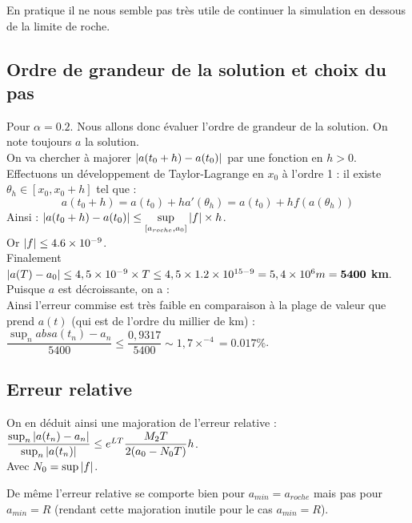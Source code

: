 \documentclass[12pt,a4paper]{article}
\begin{document}
    En pratique il ne nous semble pas très utile de continuer la simulation en dessous de la limite de roche.
	
	\vspace{-.5cm}
	
	\subsection{Ordre de grandeur de la solution et choix du pas}
	
	Pour $\alpha = 0.2$.	
	Nous allons donc évaluer l'ordre de grandeur de la solution. On note toujours $a$ la solution.\\
	On va chercher à majorer $\left\lvert a(t_0+h)-a(t_0) \right\rvert$ par une fonction en $h > 0$.\\
	Effectuons un développement de Taylor-Lagrange en $x_0$ à l'ordre 1 : il existe $\theta_h \in [x_0,x_0+h]$ tel que : 
	\[a(t_0+h) = a(t_0) + ha'(\theta_h) = a(t_0) + hf(a(\theta_h))\]
	Ainsi : $\left\lvert a(t_0+h)-a(t_0) \right\rvert \leq \underset{[a_{roche},a_0]}{\sup} \left\lvert f \right\rvert \times h$.\\
	Or $\left\lvert f \right\rvert \leq 4.6\times 10^{-9}$.\\
	Finalement $\left\lvert a(T)-a_0 \right\rvert \leq 4,5\times10^{-9}\times T \leq 4,5\times1.2\times 10^{15-9} = 5,4\times 10^6 m = \mathbf{5400}$ \textbf{km}.\\
	Puisque $a$ est décroissante, on a : \\
	
	Ainsi l'erreur commise est très faible en comparaison à la plage de valeur que prend $a(t)$ (qui est de l'ordre du millier de km) : $\dfrac{\sup_n abs{a(t_n)-a_n}}{5400} \leq \dfrac{0,9317}{5400} \sim 1,7 \times^{-4} = 0.017 \%$. 
	
	\subsection{Erreur relative}
	
	\vspace{-.5cm}
	
	On en déduit ainsi une majoration de l'erreur relative : $\dfrac{\sup_n\left\lvert a(t_n)-a_n \right\rvert}{\sup_n\left\lvert a(t_n) \right\rvert} \leq e^{LT}\dfrac{M_2 T}{2(a_0-N_0T)}h $.\\
	Avec $N_0 = \sup\left\lvert f \right\rvert$.
	
	\vspace{.2cm}
	
	De même l'erreur relative se comporte bien pour $a_{min} = a_{roche}$ mais pas pour $a_{min} = R$ (rendant cette majoration inutile pour le cas $a_{min} = R$).\\
	
\end{document}
